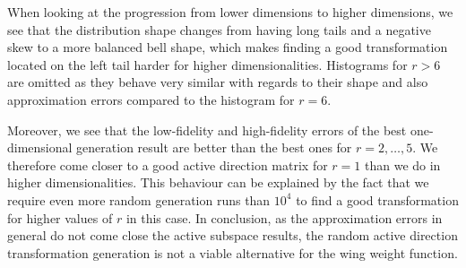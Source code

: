 \documentclass[
  a4paper,  %
  twoside,  %
  bibliography=totoc,
  headsepline,
  cleardoublepage=empty,
  parskip=half,
  draft=false
]{scrbook}
\begin{document}
When looking at the progression from lower dimensions to higher dimensions, we see that the distribution shape changes from having long tails and a negative skew to a more balanced bell shape, which makes finding a good transformation located on the left tail harder for higher dimensionalities.
Histograms for $r > 6$ are omitted as they behave very similar with regards to their shape and also approximation errors compared to the histogram for $r=6$.

Moreover, we see that the low-fidelity and high-fidelity errors of the best one-dimensional generation result are better than the best ones for $r=2, \dots, 5$.
We therefore come closer to a good active direction matrix for $r=1$ than we do in higher dimensionalities.
This behaviour can be explained by the fact that we require even more random generation runs than $10^4$ to find a good transformation for higher values of $r$ in this case.
In conclusion, as the approximation errors in general do not come close the active subspace results, the random active direction transformation generation is not a viable alternative for the wing weight function.
\end{document}
